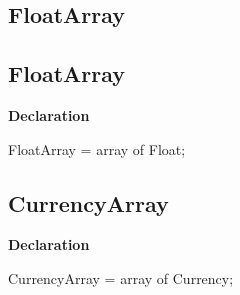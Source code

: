 \documentclass{report}
\newif\ifpdf
\begin{document}
\subsection*{\large{\textbf{FloatArray}}\normalsize\hspace{1ex}\hrulefill}
\else
\subsection*{FloatArray}
\fi
\label{NewPascal.Base-FloatArray}
\begin{list}{}{
\setlength{\itemindent}{0cm}
\setlength{\listparindent}{0cm}
\setlength{\leftmargin}{\evensidemargin}
\addtolength{\leftmargin}{\tmplength}
\settowidth{\labelsep}{X}
\addtolength{\leftmargin}{\labelsep}
\setlength{\labelwidth}{\tmplength}
}
\item[\textbf{Declaration}\hfill]
\ifpdf
\begin{flushleft}
\fi
\begin{ttfamily}
FloatArray = array of Float;\end{ttfamily}

\ifpdf
\end{flushleft}
\fi

\end{list}
\ifpdf
\subsection*{\large{\textbf{CurrencyArray}}\normalsize\hspace{1ex}\hrulefill}
\else
\subsection*{CurrencyArray}
\fi
\label{NewPascal.Base-CurrencyArray}
\begin{list}{}{
\setlength{\itemindent}{0cm}
\setlength{\listparindent}{0cm}
\setlength{\leftmargin}{\evensidemargin}
\addtolength{\leftmargin}{\tmplength}
\settowidth{\labelsep}{X}
\addtolength{\leftmargin}{\labelsep}
\setlength{\labelwidth}{\tmplength}
}
\item[\textbf{Declaration}\hfill]
\ifpdf
\begin{flushleft}
\fi
\begin{ttfamily}
CurrencyArray = array of Currency;\end{ttfamily}

\ifpdf
\end{flushleft}
\fi

\end{list}
\ifpdf
\end{document}
